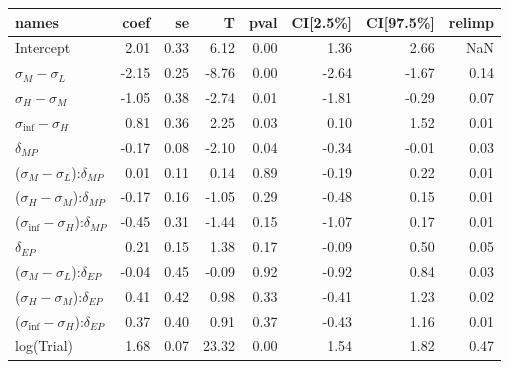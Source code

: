 

\begin{tabular}{lrrrrrrr}
\toprule
                                       names &  coef &   se &     T &  pval &  CI[2.5\%] &  CI[97.5\%] &  relimp \\
\midrule
                                   Intercept &  2.01 & 0.33 &  6.12 &  0.00 &       1.36 &        2.66 &     NaN \\
                   $\sigma_{M} - \sigma_{L}$ & -2.15 & 0.25 & -8.76 &  0.00 &      -2.64 &       -1.67 &    0.14 \\
                   $\sigma_{H} - \sigma_{M}$ & -1.05 & 0.38 & -2.74 &  0.01 &      -1.81 &       -0.29 &    0.07 \\
                $\sigma_{\inf} - \sigma_{H}$ &  0.81 & 0.36 &  2.25 &  0.03 &       0.10 &        1.52 &    0.01 \\
                               $\delta_{MP}$ & -0.17 & 0.08 & -2.10 &  0.04 &      -0.34 &       -0.01 &    0.03 \\
   ($\sigma_{M} - \sigma_{L}$):$\delta_{MP}$ &  0.01 & 0.11 &  0.14 &  0.89 &      -0.19 &        0.22 &    0.01 \\
   ($\sigma_{H} - \sigma_{M}$):$\delta_{MP}$ & -0.17 & 0.16 & -1.05 &  0.29 &      -0.48 &        0.15 &    0.01 \\
($\sigma_{\inf} - \sigma_{H}$):$\delta_{MP}$ & -0.45 & 0.31 & -1.44 &  0.15 &      -1.07 &        0.17 &    0.01 \\
                               $\delta_{EP}$ &  0.21 & 0.15 &  1.38 &  0.17 &      -0.09 &        0.50 &    0.05 \\
   ($\sigma_{M} - \sigma_{L}$):$\delta_{EP}$ & -0.04 & 0.45 & -0.09 &  0.92 &      -0.92 &        0.84 &    0.03 \\
   ($\sigma_{H} - \sigma_{M}$):$\delta_{EP}$ &  0.41 & 0.42 &  0.98 &  0.33 &      -0.41 &        1.23 &    0.02 \\
($\sigma_{\inf} - \sigma_{H}$):$\delta_{EP}$ &  0.37 & 0.40 &  0.91 &  0.37 &      -0.43 &        1.16 &    0.01 \\
                                  log(Trial) &  1.68 & 0.07 & 23.32 &  0.00 &       1.54 &        1.82 &    0.47 \\
\bottomrule
\end{tabular}


